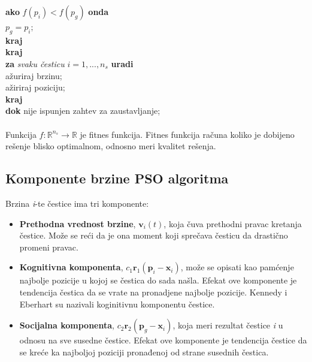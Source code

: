 \documentclass[a4paper]{article}
\begin{document}
\hspace*{10mm}\textbf{ako} $f(p_i) < f(p_g)$ \textbf{onda} \\
\hspace*{15mm} $p_g = p_i;$ \\
\hspace*{10mm} \textbf{kraj} \\
\hspace*{5mm} \textbf{kraj} \\
\hspace*{5mm} \textbf{za} \textit{svaku česticu} $i = 1,...,n_s$ \textbf{uradi}\\
\hspace*{10mm} ažuriraj brzinu; \\
\hspace*{10mm} ažiriraj poziciju; \\
\hspace*{5mm} \textbf{kraj} \\
\textbf{dok} nije ispunjen zahtev za zaustavljanje; \\ \\Funkcija $f:\mathbb{R}^{n_s} \to \mathbb{R}$ je fitnes funkcija. Fitnes funkcija računa koliko je dobijeno rešenje blisko optimalnom, odnosno meri kvalitet rešenja.
\subsection{Komponente brzine PSO algoritma}
Brzina \textit{i}-te čestice ima tri komponente:\\
\begin{itemize}
    \item \textbf{Prethodna vrednost brzine}, $\textbf{v}_i(t)$, koja čuva prethodni pravac kretanja čestice. Može se reći da je ona moment koji sprečava česticu da drastično promeni pravac. 
    \item \textbf{Kognitivna komponenta}, $c_1\textbf{r}_1(\textbf{p}_i - \textbf{x}_i)$,  može se opisati kao pamćenje najbolje pozicije u kojoj se čestica do sada našla. Efekat ove komponente je tendencija čestica da se vrate na pronadjene najbolje pozicije. Kennedy i Eberhart su nazivali koginitivnu komponentu  čestice.
    \item \textbf{Socijalna komponenta}, $c_2\textbf{r}_2(\textbf{p}_g - \textbf{x}_i)$, koja meri rezultat čestice \textit{i} u odnosu na sve susedne čestice. Efekat ove komponente je tendencija čestice da se kreće ka najboljoj poziciji pronađenoj od strane susednih čestica.
\end{itemize}
\end{document}
